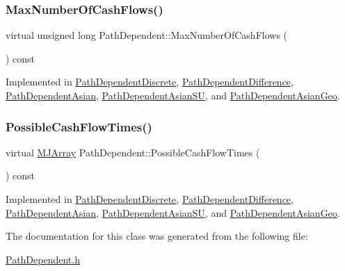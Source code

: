 \hypertarget{classPathDependent_a1ee091a4f3680339683af087dfb4ca0f}{}\label{classPathDependent_a1ee091a4f3680339683af087dfb4ca0f} 
\subsubsection{\texorpdfstring{Max\+Number\+Of\+Cash\+Flows()}{MaxNumberOfCashFlows()}}
{\footnotesize\ttfamily virtual unsigned long Path\+Dependent\+::\+Max\+Number\+Of\+Cash\+Flows (\begin{DoxyParamCaption}{ }\end{DoxyParamCaption}) const\hspace{0.3cm}{\ttfamily [pure virtual]}}



Implemented in \hyperlink{classPathDependentDiscrete_a1e320feec16a1a2b222b3e84266d7282}{Path\+Dependent\+Discrete}, \hyperlink{classPathDependentDifference_a2548403f4f6b3425254cde6f263534a8}{Path\+Dependent\+Difference}, \hyperlink{classPathDependentAsian_af11d1140df3f2ab8e9f9ccc5f3eb4d73}{Path\+Dependent\+Asian}, \hyperlink{classPathDependentAsianSU_af02b751e82d9d1d153f17b67aeac1415}{Path\+Dependent\+Asian\+SU}, and \hyperlink{classPathDependentAsianGeo_a5c499689dd6591991d48883b3116ceb6}{Path\+Dependent\+Asian\+Geo}.

\hypertarget{classPathDependent_a4c8bf82be7f4443c5c8177d7500d542d}{}\label{classPathDependent_a4c8bf82be7f4443c5c8177d7500d542d} 
\subsubsection{\texorpdfstring{Possible\+Cash\+Flow\+Times()}{PossibleCashFlowTimes()}}
{\footnotesize\ttfamily virtual \hyperlink{classMJArray}{M\+J\+Array} Path\+Dependent\+::\+Possible\+Cash\+Flow\+Times (\begin{DoxyParamCaption}{ }\end{DoxyParamCaption}) const\hspace{0.3cm}{\ttfamily [pure virtual]}}



Implemented in \hyperlink{classPathDependentDiscrete_aabb04f6c6027547a879ea765eb90675d}{Path\+Dependent\+Discrete}, \hyperlink{classPathDependentDifference_a70cb4e639817e4d4ad5ace6212c5eec9}{Path\+Dependent\+Difference}, \hyperlink{classPathDependentAsian_a58d4f5ddfc26c3c8eeefddd3834525f6}{Path\+Dependent\+Asian}, \hyperlink{classPathDependentAsianSU_aa9f5c9b0e444fd4dbe50632c1410ae5a}{Path\+Dependent\+Asian\+SU}, and \hyperlink{classPathDependentAsianGeo_ad8112de6219127c31de11d5774e80374}{Path\+Dependent\+Asian\+Geo}.



The documentation for this class was generated from the following file\+:\begin{DoxyCompactItemize}
\item 
\hyperlink{PathDependent_8h}{Path\+Dependent.\+h}\end{DoxyCompactItemize}
